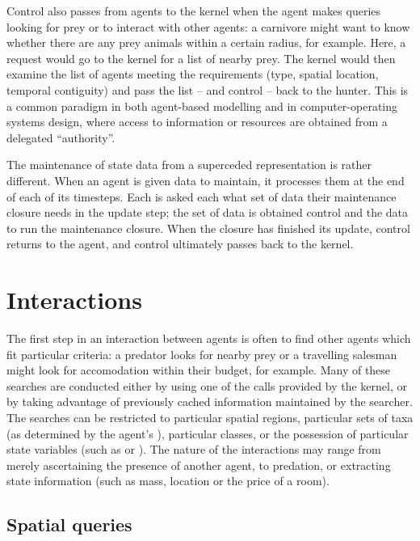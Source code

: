 Control also passes from agents to the kernel when the agent makes
queries looking for prey or to interact with other agents: a carnivore
might want to know whether there are any prey animals within a certain
radius, for example.  Here, a request would go to the kernel for a
list of nearby prey.  The kernel would then examine the list of agents
meeting the requirements (type, spatial location, temporal contiguity)
and pass the list -- and control -- back to the hunter.  This is a
common paradigm in both agent-based modelling and in
computer-operating systems design, where access to information or
resources are obtained from a delegated ``authority''.

The maintenance of state data from a superceded representation is
rather different. When an agent is given data to maintain, it
processes them at the end of each of its timesteps. Each is asked each
what set of data their maintenance closure needs in the update step;
the set of data is obtained control and the data to run the maintenance
closure. When the closure has finished its update, control returns to
the agent, and control ultimately passes back to the kernel.


\section{Interactions}\label{interactions}

The first step in an interaction between agents is often to find other
agents which fit particular criteria: a predator looks for nearby prey
or a travelling salesman might look for accomodation within their
budget, for example.  Many of these searches are conducted either by
using one of the  calls provided by the kernel, or by
taking advantage of previously cached information maintained by the
searcher. The searches can be restricted to particular spatial
regions, particular sets of taxa (as determined by the agent's
), particular classes, or the possession of particular
state variables (such as  or
). The nature of the interactions may range from
merely ascertaining the presence of another agent, to predation, or
extracting state information (such as mass, location or the price of a
room).  

\subsection{Spatial queries}


